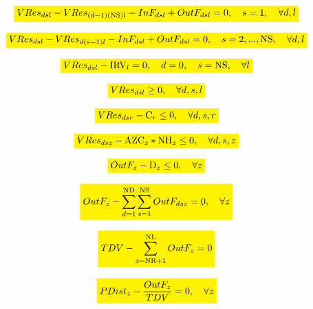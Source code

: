 \documentclass{singlecol}
\newcommand{\mathcolorbox}[2]{\colorbox{#1}{$\displaystyle #2$}}
\theoremstyle{TH}{
\newtheorem{lemma}{Lemma}
\newtheorem{theorem}[lemma]{Theorem}
\newtheorem{corrolary}[lemma]{Corrolary}
\newtheorem{conjecture}[lemma]{Conjecture}
\newtheorem{proposition}[lemma]{Proposition}
\newtheorem{claim}[lemma]{Claim}
\newtheorem{stheorem}[lemma]{Wrong Theorem}
\newtheorem{algorithm}{Algorithm}
}
\theoremstyle{THrm}{
\newtheorem{definition}{Definition}[section]
\newtheorem{question}{Question}[section]
\newtheorem{remark}{Remark}
\newtheorem{scheme}{Scheme}
}
\theoremstyle{THhit}{
\newtheorem{case}{Case}[section]
}
\begin{document}
\begin{equation}
	\mathcolorbox{yellow}{VRes_{dsl} - VRes_{(d-1)(\mathrm{NS})l} - InF_{dsl} + OutF_{dsl} = 0, \quad s=1, \quad \forall{d,l}}
 	\label{eq:volResT1}
\end{equation}

\begin{equation}
	\mathcolorbox{yellow}{VRes_{dsl} - VRes_{d(s-1)l} - InF_{dsl} + OutF_{dsl} = 0, \quad s=2,...,\mathrm{NS}, \quad \forall{d,l}}
	\label{eq:volRem!T1}
\end{equation}

\begin{equation}
	\mathcolorbox{yellow}{VRes_{dsl} - \mathrm{IRV}_l = 0, \quad d = 0, \quad s = \mathrm{NS}, \quad \forall{l}}
	\label{eq:volRStart}
\end{equation}

\begin{equation}
	\mathcolorbox{yellow}{VRes_{dsl} \geq 0, \quad \forall{d,s,l}}
	\label{eq:minRV}
\end{equation}

\begin{equation}
	\mathcolorbox{yellow}{VRes_{dsr} - \mathrm{C}_{r} \leq 0, \quad \forall{d,s,r}}
	\label{eq:maxRV}
\end{equation}

\begin{equation}
	\mathcolorbox{yellow}{VRes_{dsz} - \mathrm{AZC}_z*\mathrm{NH}_z \leq 0, \quad \forall{d,s,z}}
	\label{eq:maxRZV}
\end{equation}

\begin{equation}
	\mathcolorbox{yellow}{OutF_{z} -  \mathrm{D}_z  \leq 0,  \quad \forall z}
	\label{eq:demandRes}
\end{equation}

\begin{equation}
	\mathcolorbox{yellow}{OutF_{z} - \sum_{d=1}^{\mathrm{ND}}\sum_{s=1}^{\mathrm{NS}}{OutF_{dsz}} = 0, \quad \forall z}
	\label{eq:evalTOutFZone}
\end{equation}

\begin{equation}
	\mathcolorbox{yellow}{TDV - \sum_{z=\mathrm{NR}+1}^{\mathrm{NL}}{OutF_{z}} = 0}
	\label{eq:evalTOutF}
\end{equation}

\begin{equation}
	\mathcolorbox{yellow}{PDist_{z} - \dfrac{OutF_{z}}{TDV} = 0, \quad \forall z}
	\label{eq:evalPDist}
\end{equation}
\end{document}
